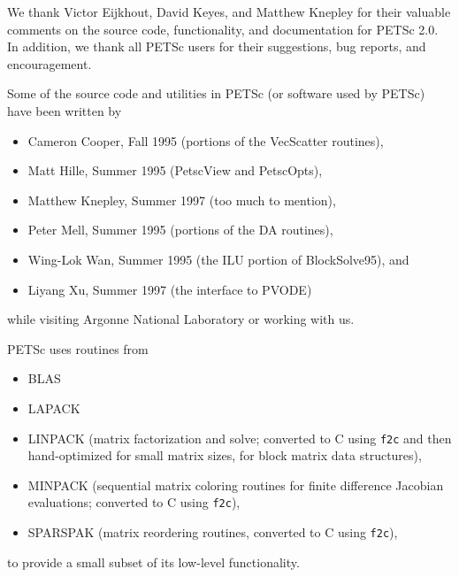 

\medskip \medskip \noindent
We thank Victor Eijkhout, David Keyes, and Matthew Knepley for their valuable comments on the 
source code, functionality, and documentation  for PETSc 2.0.  
In addition, we thank all PETSc users for
their suggestions, bug reports, and encouragement.

\vspace{.3in}
\noindent
Some of the source code and utilities in PETSc (or software used by PETSc)
have been written by 
\begin{itemize}
  \item Cameron Cooper, Fall 1995 (portions of the VecScatter routines), 
  \item Matt Hille, Summer 1995 (PetscView and PetscOpts), 
  \item Matthew Knepley, Summer 1997 (too much to mention),
  \item Peter Mell, Summer 1995 (portions of the DA routines),
  \item Wing-Lok Wan, Summer 1995 (the ILU portion of BlockSolve95), and
  \item Liyang Xu, Summer 1997 (the interface to PVODE)
\end{itemize}
while visiting Argonne National Laboratory or working with us.

\vspace{.3in}
\noindent
PETSc uses routines from 
\begin{itemize}
  \item BLAS
  \item LAPACK
  \item LINPACK      (matrix factorization and solve; converted to C using {\tt f2c} and then 
                      hand-optimized for small matrix sizes, for block matrix data structures),
  \item MINPACK      (sequential matrix coloring routines for finite difference Jacobian
                       evaluations; converted to C using {\tt f2c}),
  \item SPARSPAK     (matrix reordering routines, converted to C using {\tt f2c}),
\end{itemize}
to provide a small subset of its low-level functionality.

